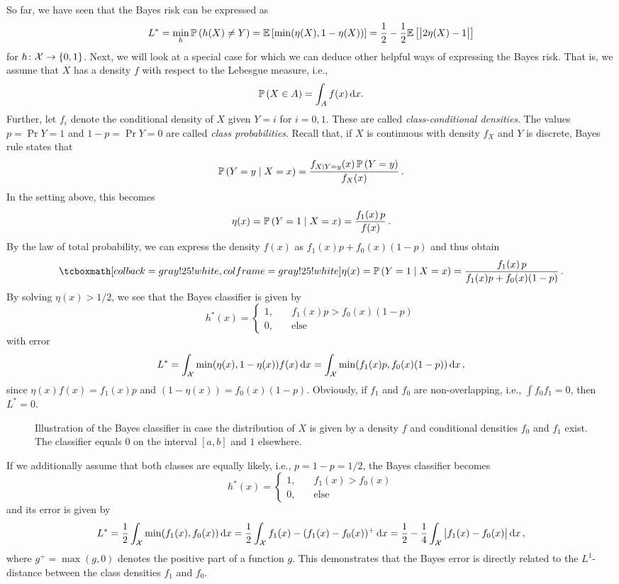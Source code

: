 So far, we have seen that the Bayes risk can be expressed as
\[
    L^* = \min_h \mathbb{P}\left(h(X) \neq Y\right) = \mathbb{E}\left[\min(\eta(X), 1-\eta(X))\right] = \frac{1}{2} - \frac{1}{2} \mathbb{E}\left[\big\lvert 2\eta(X) - 1 \big\rvert\right]
\]
for $h \colon \mathcal{X} \to \left\{0, 1\right\}$. Next, we will look at a special case for which we can deduce other helpful ways of expressing the Bayes risk. That is, we assume that $X$ has a density $f$ with respect to the Lebesgue measure, i.e.,
\[
    \mathbb{P}\left(X \in A\right) = \int_A f(x) \,\mathrm{d}x.
\]
Further, let $f_i$ denote the conditional density of $X$ given $Y = i$ for $i = 0, 1$. These are called \emph{class-conditional densities}. The values $p = \Pr{Y = 1}$ and $1 - p = \Pr{Y = 0}$ are called \emph{class probabilities}. Recall that, if $X$ is continuous with density $f_X$ and $Y$ is discrete, Bayes rule states that
\[
    \mathbb{P}\left(Y=y \mathrel{|} X=x\right) = \frac{f_{X \mathrel{|} Y=y}(x) \, \mathbb{P}\left(Y=y\right)}{f_X(x)} \, .
\]
In the setting above, this becomes
\[
    \eta(x) = \mathbb{P}\left(Y=1 \mathrel{|} X=x\right) = \frac{f_1(x) \, p}{f(x)} \, .
\]
By the law of total probability, we can express the density $f(x)$ as $f_1(x)p + f_0(x)(1-p)$ and thus obtain
\begin{equation}
    \highlightMath{
        \eta(x) = \Pr{Y=1 \given X=x} = \frac{f_1(x) \, p}{f_1(x)p + f_0(x)(1-p)} \, .
    }
\end{equation}
By solving $\eta(x) > 1/2$, we see that the Bayes classifier is given by
\[
    h^*(x) = \begin{cases}
        1, \quad & f_1(x)p > f_0(x)(1-p) \\
        0, \quad &\text{else}
    \end{cases}
\]
with error
\[
    L^* = \int_{\mathcal{X}} \min(\eta(x), 1-\eta(x)) f(x) \,\mathrm{d}x = \int_{\mathcal{X}} \min(f_1(x)p, f_0(x)(1-p)) \,\mathrm{d}x \, ,
\]
since $\eta(x)f(x) = f_1(x)p$ and $(1-\eta(x)) = f_0(x)(1-p)$. Obviously, if $f_1$ and $f_0$ are non-overlapping, i.e., $\int f_0 f_1 = 0$, then $L^* = 0$.
\begin{figure}
    \centering
    \resizebox{9cm}{!}{}
    \caption{%
        Illustration of the Bayes classifier in case the distribution of $X$ is given by a density $f$ and conditional densities $f_0$ and $f_1$ exist. The classifier equals $0$ on the interval $[a, b]$ and $1$ elsewhere.
    }
\end{figure}
If we additionally assume that both classes are equally likely, i.e., $p = 1-p = 1/2$, the Bayes classifier becomes
\[
    h^*(x) = \begin{cases}
        1, \quad & f_1(x) > f_0(x) \\
        0, \quad &\text{else}
    \end{cases}
\]
and its error is given by
\[
    L^* = \frac{1}{2} \int_{\mathcal{X}} \min(f_1(x), f_0(x)) \,\mathrm{d}x = \frac{1}{2} \int_{\mathcal{X}} f_1(x) - (f_1(x) - f_0(x))^+ \,\mathrm{d}x = \frac{1}{2} - \frac{1}{4} \int_{\mathcal{X}} \big\lvert f_1(x) - f_0(x) \big\rvert \,\mathrm{d}x \, ,
\]
where $g^+ = \max(g, 0)$ denotes the positive part of a function $g$. This demonstrates that the Bayes error is directly related to the $L^1$-distance between the class densities $f_1$ and $f_0$.
